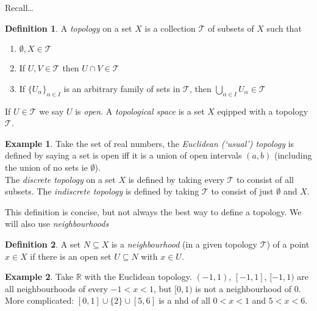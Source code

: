 \documentclass{tufte-handout}
\def\cT {\mathcal{T}}
\def\RR{\mathbb{R}}
\theoremstyle{definition}
\newtheorem{definition}{Definition}
\newtheorem{example}{Example}
\begin{document}
Recall\ldots{}

\begin{definition} 
	A \emph{topology} on a set $X$ is a collection $\cT$ of subsets of $X$ 
	such that 
	\begin{enumerate} 
	
		\item $\emptyset,X\in\cT$ 
		
		\item If $U,V\in \cT$ then $U\cap V\in \cT$ 

		\item If $\{U_\alpha\}_{\alpha\in I}$ is an arbitrary family of sets in $\cT$, then $\bigcup_{\alpha\in I} U_\alpha \in \cT$

	\end{enumerate}
 
	If $U\in \cT$ we say $U$ is \emph{open}. A \emph{topological space} is a set $X$ 
	eqipped with a topology $\cT$.
\end{definition}

\begin{example} 
	Take the set of real numbers, the \emph{Euclidean (`usual') topology} is 
	defined by saying a set is open iff it is a union of open intervals $(a,b)$ (including the 
	union of no sets ie $\emptyset$).\\ 
	The \emph{discrete topology} on a set $X$ is defined by 
	taking every $\cT$ to consist of all subsets. The \emph{indiscrete topology} is defined by 
	taking $\cT$ to consist of just $\emptyset$ and $X$. 
\end{example}

This definition is concise, but not always the best way to define a topology. We will also 
use \emph{neighbourhoods}

\begin{definition} 
	A set $N\subseteq X$ is a \emph{neighbourhood} (in a given topology $\cT$) of a point $x\in X$ if there is an open 
	set $U\subseteq N$ with $x\in U$.
\end{definition}


\begin{example} 
	Take $\RR$ with the Euclidean topology. $(-1,1)$, $[-1,1]$, $[-1,1)$ are all 
	neighbourhoods of every $-1<x<1$, but $[0,1)$ is not a neighbourhood of $0$. More 
	complicated: $[0,1] \cup \{2\}\cup [5,6]$ is a nhd of all $0<x<1$ and $5<x<6$.
\end{example}
\end{document}
